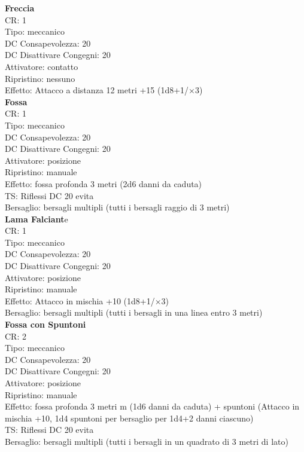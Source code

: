 \documentclass[a4paper,11pt,twoside,openany]{book}
\begin{document}
{\begin{multicols}{2}
\textbf{Freccia}\\
CR: 1 \\
Tipo: meccanico \\
DC Consapevolezza: 20 \\
DC Disattivare Congegni: 20 \\
Attivatore: contatto \\
Ripristino: nessuno \\
Effetto: Attacco a distanza 12 metri +15 (1d8+1/×3)\\

\textbf{Fossa}\\
CR: 1 \\
Tipo: meccanico \\
DC Consapevolezza: 20 \\
DC Disattivare Congegni: 20 \\
Attivatore: posizione \\
Ripristino: manuale \\
Effetto: fossa profonda 3 metri (2d6 danni da caduta) \\
TS: Riflessi DC 20 evita \\
Bersaglio: bersagli multipli (tutti i bersagli raggio di 3 metri)\\

\textbf{Lama Falciant}e\\
CR: 1 \\
Tipo: meccanico \\
DC Consapevolezza: 20 \\
DC Disattivare Congegni: 20 \\
Attivatore: posizione \\
Ripristino: manuale \\
Effetto: Attacco in mischia +10 (1d8+1/×3) \\
Bersaglio: bersagli multipli (tutti i bersagli in una linea entro 3 metri)\\

\textbf{Fossa con Spuntoni}\\
CR: 2 \\
Tipo: meccanico \\
DC Consapevolezza: 20 \\
DC Disattivare Congegni: 20 \\
Attivatore: posizione \\
Ripristino: manuale \\
Effetto: fossa profonda 3 metri m (1d6 danni da caduta) + spuntoni (Attacco in mischia +10, 1d4 spuntoni per bersaglio per 1d4+2 danni ciascuno) \\
TS: Riflessi DC 20 evita \\
Bersaglio: bersagli multipli (tutti i bersagli in un quadrato di 3 metri di lato)\\


\end{multicols}}
\end{document}
